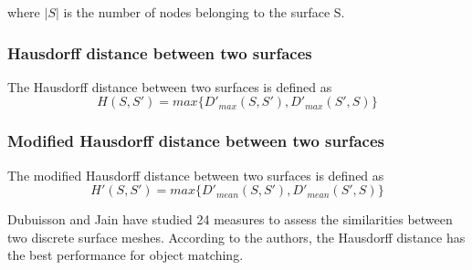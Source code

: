 where $\vert S \vert$ is the number of nodes belonging to the surface S.
\subsubsection*{Hausdorff distance between two surfaces}
The Hausdorff distance \citep{huttenlocher_comparing_1993} between two surfaces is defined as 
\begin{equation}
H(S,S') = max \lbrace D'_{max}(S,S'), D'_{max}(S',S)\rbrace
\end{equation}
\subsubsection*{Modified Hausdorff distance between two surfaces}
The modified Hausdorff distance between two surfaces is defined as 
\begin{equation}
H'(S,S') = max \lbrace D'_{mean}(S,S'), D'_{mean}(S',S)\rbrace
\end{equation}

Dubuisson and Jain \cite{dubuisson_modified_1994} have studied 24 measures to assess the similarities between two discrete surface meshes. According to the authors, the Hausdorff distance has the best performance for object matching.
